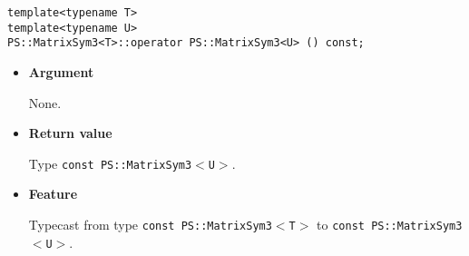 
\begin{screen}
\begin{verbatim}
template<typename T>
template<typename U>
PS::MatrixSym3<T>::operator PS::MatrixSym3<U> () const;
\end{verbatim}
\end{screen}

\begin{itemize}

\item{{\bf Argument}}

  None.

\item{{\bf Return value}}

  Type \texttt{const PS::MatrixSym3$<$U$>$}.


\item{{\bf Feature}}

  Typecast from type \texttt{const PS::MatrixSym3$<$T$>$} to \texttt{const
  PS::MatrixSym3$<$U$>$}.

\end{itemize}

